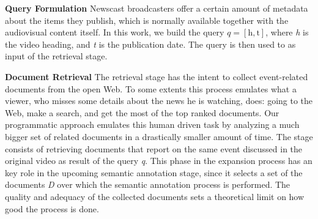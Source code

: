 \documentclass{llncs}
\begin{document}
{\bf Query Formulation} %
Newscast broadcasters offer a certain amount of metadata about the items they publish, which is normally available together with the audiovisual content itself. In this work, we build the query $q= \left [ \text{h}, \text{t} \right ]$, where \textit{h} is the video heading, and \textit{t} is the publication date. The query is then used to as input of the retrieval stage.

{\bf Document Retrieval}
The retrieval stage has the intent to collect event-related documents from the open Web. To some extents this process emulates what a viewer, who misses some details about the news he is watching, does: going to the Web, make a search, and get the most of the top ranked documents. Our programmatic approach emulates this human driven task by analyzing a much bigger set of related documents in a drastically smaller amount of time. The stage consists of retrieving documents that report on the same event discussed in the original video as result of the query \textit{q}. This phase in the expansion process has an key role in the upcoming semantic annotation stage, since it selects a set of the documents \textit{D} over which the semantic annotation process is performed. The quality and adequacy of the collected documents sets a theoretical limit on how good the process is done. 
\end{document}
